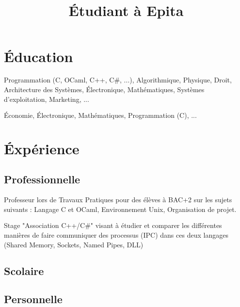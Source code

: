 \documentclass[11pt,a4paper]{moderncv}
\title{\'{E}tudiant à Epita}
\begin{document}
\makecvtitle

\section{\'{E}ducation}

{Programmation (C, OCaml, C++, C\#, ...), Algorithmique, Physique, Droit,
    Architecture des Systèmes, \'{E}lectronique,
    Mathématiques, Systèmes d'exploitation, Marketing, ... }

{\'{E}conomie, \'{E}lectronique, Mathématiques, Programmation (C), ...}

{}

\section{\'{E}xpérience}

\subsection{Professionnelle}

{Professeur lors de Travaux Pratiques pour des élèves à BAC+2 sur les sujets
    suivants : Langage C et OCaml, Environnement Unix, Organisation de projet.}

{Stage "Association C++/C\#" visant à étudier et comparer les différentes
    manières de faire communiquer des processus (IPC) dans ces deux langages
    (Shared Memory, Sockets, Named Pipes, DLL)}

\subsection{Scolaire}



\subsection{Personnelle}
\end{document}
